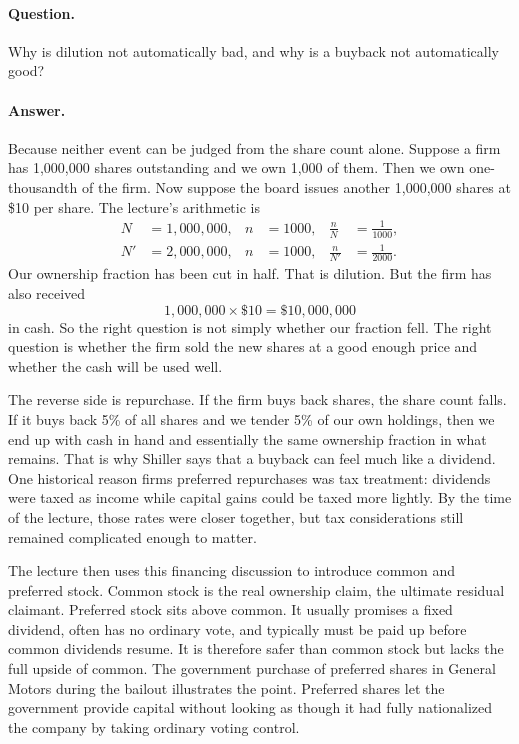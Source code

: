 \paragraph{Question.} Why is dilution not automatically bad, and why is a buyback not automatically good?

\paragraph{Answer.} Because neither event can be judged from the share count alone. Suppose a firm has 1,000,000 shares outstanding and we own 1,000 of them. Then we own one-thousandth of the firm. Now suppose the board issues another 1,000,000 shares at \$10 per share. The lecture's arithmetic is
\begin{align}
N &= 1{,}000{,}000, & n &= 1000, & \frac{n}{N} &= \frac{1}{1000}, \\
N' &= 2{,}000{,}000, & n &= 1000, & \frac{n}{N'} &= \frac{1}{2000}.
\end{align}
Our ownership fraction has been cut in half. That is dilution. But the firm has also received
\begin{equation}
1{,}000{,}000 \times \$10 = \$10{,}000{,}000
\end{equation}
in cash. So the right question is not simply whether our fraction fell. The right question is whether the firm sold the new shares at a good enough price and whether the cash will be used well.

The reverse side is repurchase. If the firm buys back shares, the share count falls. If it buys back 5\% of all shares and we tender 5\% of our own holdings, then we end up with cash in hand and essentially the same ownership fraction in what remains. That is why Shiller says that a buyback can feel much like a dividend. One historical reason firms preferred repurchases was tax treatment: dividends were taxed as income while capital gains could be taxed more lightly. By the time of the lecture, those rates were closer together, but tax considerations still remained complicated enough to matter.

The lecture then uses this financing discussion to introduce common and preferred stock. Common stock is the real ownership claim, the ultimate residual claimant. Preferred stock sits above common. It usually promises a fixed dividend, often has no ordinary vote, and typically must be paid up before common dividends resume. It is therefore safer than common stock but lacks the full upside of common. The government purchase of preferred shares in General Motors during the bailout illustrates the point. Preferred shares let the government provide capital without looking as though it had fully nationalized the company by taking ordinary voting control.


